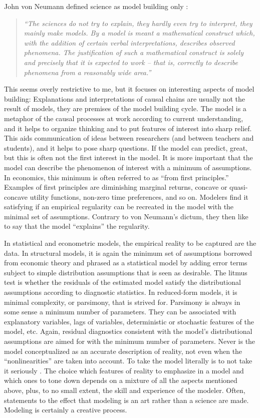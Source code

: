 \documentclass[graybox]{svmult}
\begin{document}
John von Neumann defined science as model building only \citep{Neumann1995}:
\begin{quote}\it
``The sciences do not try to explain, they hardly even try to interpret, they mainly make models. By a model is meant a mathematical construct which, with the addition of certain verbal interpretations, describes observed phenomena. The justification of such a mathematical construct is solely and precisely that it is expected to work -- that is, correctly to describe phenomena from a reasonably wide area.''
\end{quote}
This seems overly restrictive to me, but it focuses on interesting aspects of model building: Explanations and interpretations of causal chains are usually not the result of models, they are premises of the model building cycle. The model is a metaphor of the causal processes at work according to current understanding, and it helps to organize thinking and to put features of interest into sharp relief. This aids communication of ideas between researchers (and between teachers and students), and it helps to pose sharp questions. If the model can predict, great, but this is often not the first interest in the model. It is more important that the model can describe the phenomenon of interest with a minimum of assumptions. In economics, this minimum is often referred to as ``from first principles.'' Examples of first principles are diminishing marginal returns, concave or quasi-concave utility functions, non-zero time preferences, and so on. Modelers find it satisfying if an empirical regularity can be recreated in the model with the minimal set of assumptions. Contrary to von Neumann's dictum, they then like to say that the model ``explains'' the regularity. 

In statistical and econometric models, the  empirical reality to be captured are the data. In structural models, it is again the minimum set of assumptions borrowed from economic theory and phrased as a statistical model by adding error terms subject to simple distribution assumptions that is seen as desirable. The litmus test is whether the residuals of the estimated model satisfy the distributional assumptions according to diagnostic statistics. In reduced-form models, it is minimal complexity, or parsimony, that is strived for. Parsimony is always in some sense a minimum number of parameters. They can be associated with explanatory variables, lags of variables, deterministic or stochastic features of the model, etc. Again, residual diagnostics consistent with the model's distributional assumptions are aimed for with the minimum number of parameters. Never is the model conceptualized as an accurate description of reality, not even when the ``nonlinearities'' are taken into account. To take the model literally is to not take it seriously \citep{Thompson2022}. The choice which features of reality to emphasize in a model and which ones to tone down depends on a mixture of all the aspects mentioned above, plus, to no small extent, the skill and experience of the modeler. Often, statements to the effect that modeling is an art rather than a science are made. Modeling is certainly a creative process.
\end{document}
